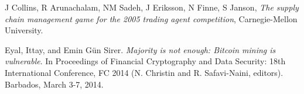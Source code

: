 \documentclass[runningheads, 12pt]{article}
\begin{document}
\noindent[CAS+05]  J Collins, R Arunachalam, NM Sadeh, J Eriksson, N Finne, S Janson, \emph{The supply chain management game for the 2005 trading agent competition}, Carnegie-Mellon University.
\vspace{4pt}

\noindent[ES14] Eyal, Ittay, and Emin Gün Sirer. \emph{Majority is not enough: Bitcoin mining is vulnerable}. In Proceedings of Financial Cryptography and Data Security: 18th International Conference, FC 2014 (N. Christin and R. Safavi-Naini, editors). Barbados, March 3-7, 2014.
\end{document}
